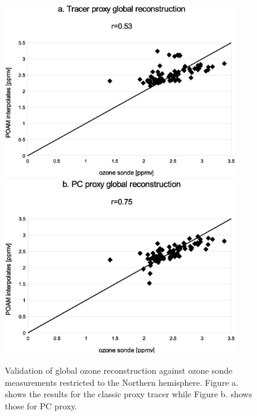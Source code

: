 \documentclass{article}
\begin{document}
\begin{figure}
  \centering
  \includegraphics[width=0.9\textwidth]{global_classic_sonde_Nhemi}
  \includegraphics[width=0.9\textwidth]{global_PC_sonde_Nhemi}
  \caption{Validation of global ozone reconstruction against ozone sonde measurements restricted to the Northern hemisphere.
  Figure a. shows the results for the classic proxy tracer while Figure b. shows those for PC proxy.}
  \label{Nhemi_restrict}
\end{figure}
\end{document}
